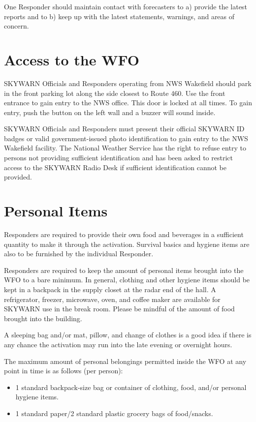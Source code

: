 \documentclass[pdflatex,letterpaper,twoside,12pt]{book}
\begin{document}
One Responder should maintain contact with forecasters to a) provide the latest reports and to b) keep up with the latest statements, warnings, and areas of concern.


\section{Access to the WFO}

SKYWARN Officials and Responders operating from NWS Wakefield should park in the front parking lot along the side closest to Route 460.  Use the front entrance to gain entry to the NWS office. This door is locked at all times.  To gain entry, push the button on the left wall and a buzzer will sound inside. 

SKYWARN Officials and Responders must present their official SKYWARN ID badges or valid government-issued photo identification to gain entry to the NWS Wakefield facility.  The National Weather Service has the right to refuse entry to persons not providing sufficient identification and has been asked to restrict access to the SKYWARN Radio Desk if sufficient identification cannot be provided.


\section{Personal Items}

Responders are required to provide their own food and beverages in a sufficient quantity to make it through the activation. Survival basics and hygiene items are also to be furnished by the individual Responder.

Responders are required to keep the amount of personal items brought into the WFO to a bare minimum.  In general, clothing and other hygiene items should be kept in a backpack in the supply closet at the radar end of the hall.   A refrigerator, freezer, microwave, oven, and coffee maker are available for SKYWARN use in the break room.   Please be mindful of the amount of food brought into the building.

A sleeping bag and/or mat, pillow, and change of clothes is a good idea if there is any chance the activation may run into the late evening or overnight hours.

The maximum amount of personal belongings permitted inside the WFO at any point in time is as follows (per person):
\begin{itemize}
\item 1 standard backpack-size bag or container of clothing, food, and/or personal hygiene items.
\item 1 standard paper/2 standard plastic grocery bags of food/snacks.
\end{itemize}
\end{document}
